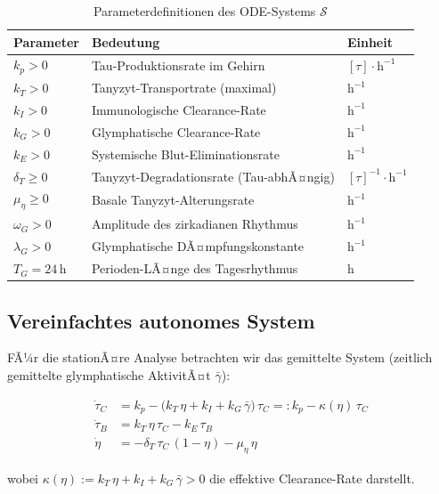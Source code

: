 ﻿\documentclass[12pt,a4paper]{article}
\theoremstyle{definition}
\begin{document}
	\begin{table}[H]
		\centering
		\caption{Parameterdefinitionen des ODE-Systems $\mathcal{S}$}
		\label{tab:parameter}
		\begin{tabular}{lll}
			\toprule
			\textbf{Parameter} & \textbf{Bedeutung} & \textbf{Einheit} \\
			\midrule
			$k_p > 0$ & Tau-Produktionsrate im Gehirn & $[\tau]\cdot\text{h}^{-1}$ \\
			$k_T > 0$ & Tanyzyt-Transportrate (maximal) & $\text{h}^{-1}$ \\
			$k_I > 0$ & Immunologische Clearance-Rate & $\text{h}^{-1}$ \\
			$k_G > 0$ & Glymphatische Clearance-Rate & $\text{h}^{-1}$ \\
			$k_E > 0$ & Systemische Blut-Eliminationsrate & $\text{h}^{-1}$ \\
			$\delta_T \geq 0$ & Tanyzyt-Degradationsrate (Tau-abhÃ¤ngig) & $[\tau]^{-1}\cdot\text{h}^{-1}$ \\
			$\mu_\eta \geq 0$ & Basale Tanyzyt-Alterungsrate & $\text{h}^{-1}$ \\
			$\omega_G > 0$ & Amplitude des zirkadianen Rhythmus & $\text{h}^{-1}$ \\
			$\lambda_G > 0$ & Glymphatische DÃ¤mpfungskonstante & $\text{h}^{-1}$ \\
			$T_G = 24\,\text{h}$ & Perioden-LÃ¤nge des Tagesrhythmus & $\text{h}$ \\
			\bottomrule
		\end{tabular}
	\end{table}
	
	\subsection{Vereinfachtes autonomes System}
	
	FÃ¼r die stationÃ¤re Analyse betrachten wir das gemittelte System (zeitlich gemittelte glymphatische AktivitÃ¤t $\bar{\gamma}$):
	
	\begin{align}
		\dot{\tau}_C &= k_p - \bigl(k_T\,\eta + k_I + k_G\,\bar{\gamma}\bigr)\,\tau_C =: k_p - \kappa(\eta)\,\tau_C \label{eq:auto1}\\
		\dot{\tau}_B &= k_T\,\eta\,\tau_C - k_E\,\tau_B \label{eq:auto2}\\
		\dot{\eta}   &= -\delta_T\,\tau_C\,(1-\eta) - \mu_\eta\,\eta \label{eq:auto3}
	\end{align}
	
	wobei $\kappa(\eta) := k_T\,\eta + k_I + k_G\,\bar{\gamma} > 0$ die effektive Clearance-Rate darstellt.
	
\end{document}
